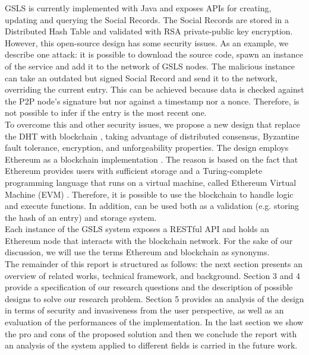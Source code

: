 GSLS is currently implemented with Java and exposes APIs for creating, updating and querying the Social Records. The Social Records are stored in a Distributed Hash Table \cite{tomp2p_2009} and validated with RSA private-public key encryption. However, this open-source design has some security issues. As an example, we describe one attack: it is possible to download the source code, spawn an instance of the service and add it to the network of GSLS nodes. The malicious instance can take an outdated but signed Social Record and send it to the network, overriding the current entry. This can be achieved because data is checked against the P2P node's signature but nor against a timestamp nor a nonce. Therefore, is not possible to infer if the entry is the most recent one. 
\\

To overcome this and other security issues, we propose a new design that replace the DHT with blockchain \cite{nakamoto_bitcoin_2008}, taking advantage of distributed consensus, Byzantine fault tolerance, encryption, and unforgeability properties. The design employs Ethereum as a blockchain implementation \cite{wood_ethereum_2014}. The reason is based on the fact that Ethereum provides users with sufficient storage and a Turing-complete programming language that runs on a virtual machine, called Ethereum Virtual Machine (EVM) \cite{wood_ethereum_2014}. Therefore, it is possible to use the blockchain to handle logic and execute functions. In addition, can be used both as a validation (e.g. storing the hash of an entry) and storage system. 
\\

Each instance of the GSLS system exposes a RESTful API and holds an Ethereum node that interacts with the blockchain network. For the sake of our discussion, we will use the terms Ethereum and blockchain as synonyms.
\\

The remainder of this report is structured as follows: the next section presents an overview of related works, technical framework, and background. Section 3 and 4 provide a specification of our research questions and the description of possible designs to solve our research problem. Section 5 provides an analysis of the design in terms of security and invasiveness from the user perspective, as well as an evaluation of the performances of the implementation. In the last section we show the pro and cons of the proposed solution and then we conclude the report with an analysis of the system applied to different fields is carried in the future work. 
